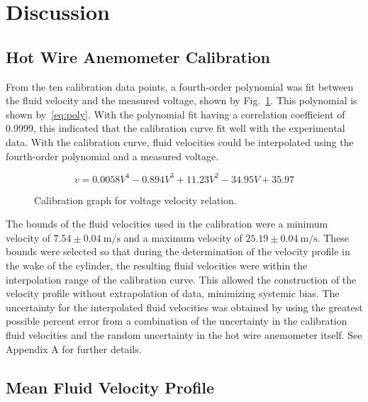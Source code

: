 \documentclass[journal,letterpaper]{IEEEtran}
\begin{document}
\section{Discussion}

\subsection{Hot Wire Anemometer Calibration}

From the ten calibration data points, a fourth-order polynomial was fit between the fluid velocity and the measured voltage, shown by Fig.~\ref{fig:calCurve}.
This polynomial is shown by~\eqref{eq:poly}.
With the polynomial fit having a correlation coefficient of 0.9999, this indicated that the calibration curve fit well with the experimental data.
With the calibration curve, fluid velocities could be interpolated using the fourth-order polynomial and a measured voltage.

\begin{equation} \label{eq:poly}
    v = 0.0058V^4 - 0.894V^3 + 11.23V^2 - 34.95V + 35.97
\end{equation}

\begin{figure}[H]
    \centering
    
    \caption{Calibration graph for voltage velocity relation.}
    \label{fig:calCurve}
\end{figure}

The bounds of the fluid velocities used in the calibration were a minimum velocity of $7.54 \pm \qty{0.04}{\m\per\s}$ and a maximum velocity of $25.19 \pm \qty{0.04}{\m\per\s}$.
These bounds were selected so that during the determination of the velocity profile in the wake of the cylinder, the resulting fluid velocities were within the interpolation range of the calibration curve.
This allowed the construction of the velocity profile without extrapolation of data, minimizing systemic bias.
The uncertainty for the interpolated fluid velocities was obtained by using the greatest possible percent error from a combination of the uncertainty in the calibration fluid velocities and the random uncertainty in the hot wire anemometer itself.
See Appendix A for further details.

\subsection{Mean Fluid Velocity Profile}
\end{document}
